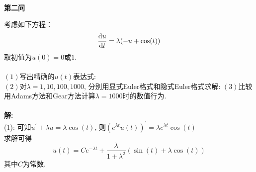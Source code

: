 \documentclass[12pt]{article}
\begin{document}
	
	
	
\quad	\\
	\begin{center}
		\textbf{第二问}
	\end{center}


\noindent 考虑如下方程：$$\frac{{\rm d}u}{{\rm d }t}=\lambda(-u+\cos (t))$$
取初值为$u(0)=0$或$1$.\\
\quad \\
$(1)$写出精确的$u(t)$表达式:\\
$(2)$对$\lambda=1,10,100,1000$, 分别用显式Euler格式和隐式Euler格式求解:
$(3)$比较用Adams方法和Gear方法计算$\lambda=1000$时的数值行为.\\
\quad\\
\noindent \textbf{解:}\\
(1): 可知$u^{'} + \lambda u=\lambda \cos (t) $, 则$(e^{\lambda t}u(t))^{'}=\lambda e^{\lambda t}\cos (t)$\\
求解可得$$u(t)=Ce^{-\lambda t}+\frac{\lambda}{1+\lambda^2}(\sin (t)+\lambda \cos (t))$$
\noindent 其中$C$为常数. 
\end{document}

